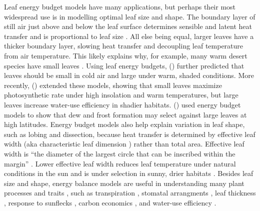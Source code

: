 \documentclass[11pt, oneside]{article}
\begin{document}
Leaf energy budget models have many applications, but perhaps their most widespread use is in modelling optimal leaf size and shape. The boundary layer of still air just above and below the leaf surface determines sensible and latent heat transfer and is proportional to leaf size \citep{Gates_1968}. All else being equal, larger leaves have a thicker boundary layer, slowing heat transfer and decoupling leaf temperature from air temperature. This likely explains why, for example, many warm desert species have small leaves \citep{Gibson_1998}. Using leaf energy budgets, \citeauthor{Parkhurst_Loucks_1972} (\citeyear{Parkhurst_Loucks_1972}) further predicted that leaves should be small in cold air and large under warm, shaded conditions. More recently, \citeauthor{Okajima_etal_2012} (\citeyear{Okajima_etal_2012}) extended these models, showing that small leaves maximize photosynthetic rate under high insolation and warm temperatures, but large leaves increase water-use efficiency in shadier habitats. \citeauthor{Wright_etal_2017} (\citeyear{Wright_etal_2017}) used energy budget models to show that dew and frost formation may select against large leaves at high latitudes. Energy budget models also help explain variation in leaf shape, such as lobing and dissection, because heat transfer is determined by effective leaf width (aka characteristic leaf dimension \citep{Taylor_1975}) rather than total area. Effective leaf width is ``the diameter of the largest circle that can be inscribed within the margin'' \citep{Leigh_etal_2017}. Lower effective leaf width reduces leaf temperature under natural conditions in the sun \citep{Leigh_etal_2017} and is under selection in sunny, drier habitats \citep{Ferris_etal_2015}. Besides leaf size and shape, energy balance models are useful in understanding many plant processes and traits \citep{Gates_1965}, such as transpiration \citep{Gates_1968}, stomatal arrangments \citep{Foster_Smith_1986}, leaf thickness \citep{Leigh_etal_2012}, response to sunflecks \citep{Schymanski_etal_2013}, carbon economics \citep{Michaletz_etal_2016}, and water-use efficiency \citep{Schymanski_Or_2016}. 
\end{document}
